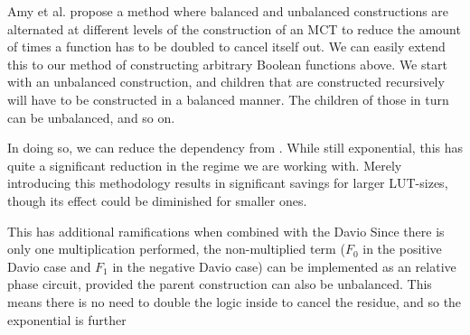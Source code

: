 \documentclass[paper]{ieice}
\providecommand{\DIFadd}[1]{{\protect\color{blue}{#1}}} %
\providecommand{\DIFaddbegin}{} %
\providecommand{\DIFaddend}{} %
\newcommand{\DIFaddincludegraphics}[2][]{{\color{blue}\fbox{\DIFOincludegraphics[#1]{#2}}}} %
\DeclareRobustCommand{\DIFaddbegin}{\DIFOaddbegin \let\includegraphics\DIFaddincludegraphics} %
\DeclareRobustCommand{\DIFaddend}{\DIFOaddend \let\includegraphics\DIFOincludegraphics} %
\begin{document}
\DIFaddend Amy et al. \DIFaddbegin \DIFadd{~\mbox{%
\cite{bib-amy-phase-state} }\hskip0pt%
 }\DIFaddend propose a method where balanced and unbalanced constructions are alternated at different levels of the
construction of an MCT to reduce the amount of times a function has to be doubled to cancel itself out. 
\DIFaddbegin \DIFadd{Unbalanced constructions can be used inside balanced constructions,
and vice versa. }\DIFaddend We can easily extend this to our method of constructing arbitrary Boolean functions above. We start  \DIFaddbegin \DIFadd{by implementing the decomposition
about our first variable }\DIFaddend with an unbalanced construction, and  \DIFaddbegin \DIFadd{its immediate }\DIFaddend children that are constructed recursively will have to be constructed
in a balanced manner. The children of those in turn can be unbalanced, and so on. 

In doing so, we can reduce the dependency from \DIFaddbegin \DIFadd{$2^{n-1}$ to $2^{\frac{n-1}{2}}$ }\DIFaddend . While still exponential, this has quite
a significant reduction in the regime we are working with.  Merely introducing this methodology results in significant savings for larger LUT-sizes, though
its effect could be diminished for smaller ones.

This has additional ramifications when combined with the Davio  \DIFaddbegin \DIFadd{expansions. Recall that we have only specified a limitation for
the unbalanced construction's use within multiplication i.e. when it is used between a pair of Hadamard gates. There is no such
restriction when we are not doing any multiplication. }\DIFaddend Since there is only one multiplication performed, the non-multiplied term
($F_0$ in the positive Davio case and $F_1$ in the negative Davio case) can be implemented as an  \DIFaddbegin \DIFadd{unbalanced }\DIFaddend relative phase circuit,
provided the parent construction can also be unbalanced. This means there is no need to double the logic inside to cancel the residue,
and so the exponential is further  \DIFaddbegin \DIFadd{mitigated. 
 }\DIFaddend 
\end{document}
